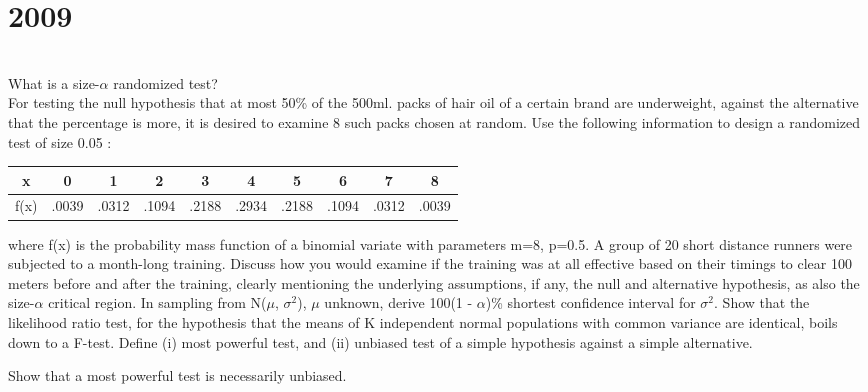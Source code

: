 \section*{2009}
\vspace{-.5cm}
\hrulefill \smallskip\\
 What is a size-$\alpha$ randomized test?\smallskip \\
For testing the null hypothesis that at most 50\% of the 500ml. packs of hair oil of a certain brand are underweight, against the alternative that the percentage is more, it is desired to examine 8 such packs chosen at random. Use the following information to design a randomized test of size 0.05 :
\begin{center}
    \begin{tabular}{|*{10}{c|}}
        \hline
        x & 0 & 1 & 2 & 3 & 4 & 5 & 6 & 7 & 8  \\\hline
        f(x) & .0039 &.0312 & .1094 & .2188 & .2934 & .2188 & .1094 & .0312 & .0039\\\hline 
    \end{tabular}
\end{center}
where f(x) is the probability mass function of a binomial variate with parameters m=8, p=0.5.
\myline
{} A group of 20 short distance runners were subjected to a month-long training. Discuss how you would examine if the training was at all effective based on their timings to clear 100 meters before and after the training, clearly mentioning the underlying assumptions, if any, the null and alternative hypothesis, as also the size-$\alpha$ critical region.
\myline
{} In sampling from N($\mu$, $\sigma^2 $), $\mu$ unknown, derive 100(1 - $\alpha$)\% shortest confidence interval for $\sigma^2$.
\myline
{} Show that the likelihood ratio test, for the hypothesis that the means of K independent normal populations with common variance are identical, boils down to a F-test.
\myline
{} Define (i) most powerful test, and (ii) unbiased test of a simple hypothesis against a simple alternative.
\par Show that a most powerful test is necessarily unbiased.